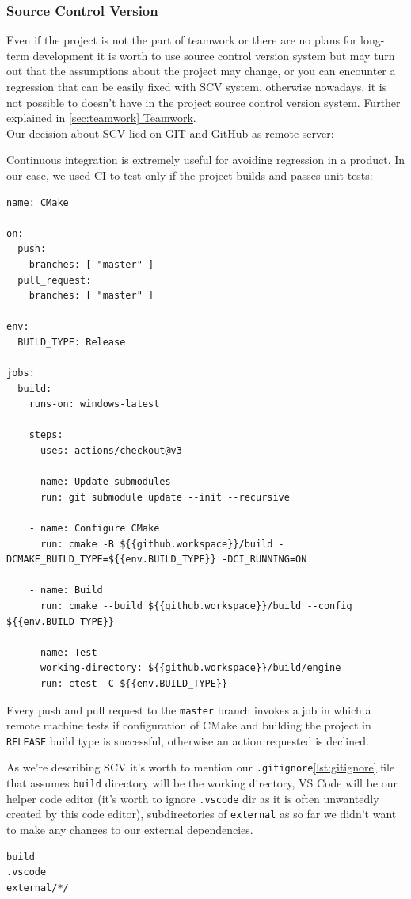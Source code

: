 \subsubsection{Source Control Version}
\label{sec:scv}
Even if the project is not the part of teamwork or there are no plans for long-term development it is worth to use source control version system but may turn out that the assumptions about the project may change, or you can encounter a regression that can be easily fixed with SCV system, otherwise nowadays, it is not possible to doesn't have in the project source control version system. Further explained in \hyperref[sec:teamwork]{\ref*{sec:teamwork} Teamwork}.\\
Our decision about SCV lied on GIT and GitHub as remote server:

\label{lst:cicmake}
Continuous integration is extremely useful for avoiding regression in a product. In our case, we used CI to test only if the project builds and passes unit tests:
\begin{lstlisting}[caption=Continuous intergration build test (./.github/workflows/.cmake.yml)]
name: CMake

on:
  push:
    branches: [ "master" ]
  pull_request:
    branches: [ "master" ]

env:
  BUILD_TYPE: Release

jobs:
  build:
    runs-on: windows-latest

    steps:
    - uses: actions/checkout@v3

    - name: Update submodules
      run: git submodule update --init --recursive

    - name: Configure CMake
      run: cmake -B ${{github.workspace}}/build -DCMAKE_BUILD_TYPE=${{env.BUILD_TYPE}} -DCI_RUNNING=ON

    - name: Build
      run: cmake --build ${{github.workspace}}/build --config ${{env.BUILD_TYPE}}

    - name: Test
      working-directory: ${{github.workspace}}/build/engine
      run: ctest -C ${{env.BUILD_TYPE}}
\end{lstlisting}
Every push and pull request to the \texttt{master} branch invokes a job in which a remote machine tests if configuration of CMake and building the project in \texttt{RELEASE} build type is successful, otherwise an action requested is declined.

As we're describing SCV it's worth to mention our \texttt{.gitignore}\ref{lst:gitignore} file that assumes \texttt{build} directory will be the working directory, VS Code will be our helper code editor (it's worth to ignore \texttt{.vscode} dir as it is often unwantedly created by this code editor), subdirectories of \texttt{external} as so far we didn't want to make any changes to our external dependencies.
\label{lst:gitignore}
\begin{lstlisting}[caption=\texttt{.gitignore} (./.gitignore)]
build
.vscode
external/*/
\end{lstlisting}